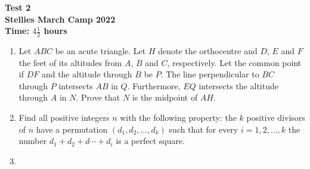 \documentclass{article}
\begin{document}
\thispagestyle{empty}

\begin{center}
  \textbf{\Large Test 2}
  \\ \vspace{1em}
  \textbf{\large Stellies March Camp 2022}
  \\ \vspace{1em}
  \textbf{\large Time: $4\frac{1}{2}$ hours}
\end{center}

\vspace{24pt}

\begin{enumerate}[itemsep=12pt]

\item %
Let $ABC$ be an acute triangle.
Let $H$ denote the orthocentre and $D$, $E$ and $F$ the feet of its altitudes from $A$, $B$ and $C$, respectively.
Let the common point if $DF$ and the altitude through $B$ be $P$.
The line perpendicular to $BC$ through $P$ intersects $AB$ in $Q$.
Furthermore, $EQ$ intersects the altitude through $A$ in $N$.
Prove that $N$ is the midpoint of $AH$.

\item %
Find all positive integers $n$ with the following property:
the $k$ positive divisors of $n$ have a permutation $(d_1, d_2, \dotsc, d_k)$ such that for every $i = 1, 2, \dotsc, k$ the number $d_1 +d_2 +d\dotsb +d_i$ is a perfect square.

\item %


\end{enumerate}

\vfill
\centering
\begin{BVerbatim}
\end{BVerbatim}
\end{document}
